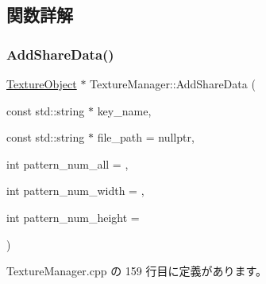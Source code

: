 \subsection{関数詳解}
\mbox{\label{class_texture_manager_a571c5b288fe16c53965f45d8bd7c8769}} 
\subsubsection{\texorpdfstring{Add\+Share\+Data()}{AddShareData()}}
{\footnotesize\ttfamily \mbox{\hyperlink{class_texture_object}{Texture\+Object}} $\ast$ Texture\+Manager\+::\+Add\+Share\+Data (\begin{DoxyParamCaption}\item[{const std\+::string $\ast$}]{key\+\_\+name,  }\item[{const std\+::string $\ast$}]{file\+\_\+path = {\ttfamily nullptr},  }\item[{int}]{pattern\+\_\+num\+\_\+all = {},  }\item[{int}]{pattern\+\_\+num\+\_\+width = {},  }\item[{int}]{pattern\+\_\+num\+\_\+height = {} }\end{DoxyParamCaption})\hspace{0.3cm}{\ttfamily [static]}}



 Texture\+Manager.\+cpp の 159 行目に定義があります。

